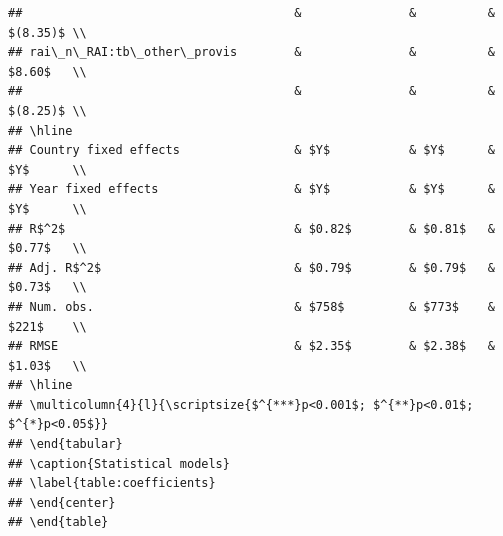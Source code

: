 \documentclass[
]{article}
\begin{document}
\begin{verbatim}
##                                      &               &          & $(8.35)$ \\
## rai\_n\_RAI:tb\_other\_provis        &               &          & $8.60$   \\
##                                      &               &          & $(8.25)$ \\
## \hline
## Country fixed effects                & $Y$           & $Y$      & $Y$      \\
## Year fixed effects                   & $Y$           & $Y$      & $Y$      \\
## R$^2$                                & $0.82$        & $0.81$   & $0.77$   \\
## Adj. R$^2$                           & $0.79$        & $0.79$   & $0.73$   \\
## Num. obs.                            & $758$         & $773$    & $221$    \\
## RMSE                                 & $2.35$        & $2.38$   & $1.03$   \\
## \hline
## \multicolumn{4}{l}{\scriptsize{$^{***}p<0.001$; $^{**}p<0.01$; $^{*}p<0.05$}}
## \end{tabular}
## \caption{Statistical models}
## \label{table:coefficients}
## \end{center}
## \end{table}
\end{verbatim}
\end{document}
